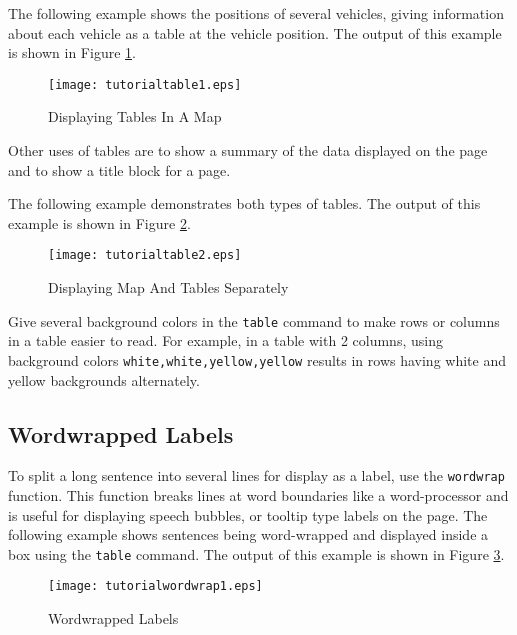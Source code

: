 The following example shows the positions of several vehicles,
giving information about each vehicle as a table at the vehicle
position.  The output of this example is shown in Figure \ref{tutorialtable1}.



\begin{figure}[htb]
\texttt{[image: tutorialtable1.eps]}
\caption{Displaying Tables In A Map}
\label{tutorialtable1}
\end{figure}

Other uses of tables are to show a summary of the data 
displayed on the page and to show a title block for a page.

The following example demonstrates both types of tables.
The output of this example is shown in Figure \ref{tutorialtable2}.



\begin{figure}[htb]
\texttt{[image: tutorialtable2.eps]}
\caption{Displaying Map And Tables Separately}
\label{tutorialtable2}
\end{figure}

Give several background colors in the \texttt{table} command to make rows or
columns in a table easier to read.  For example, in a table with 2 columns,
using background colors \texttt{white,white,yellow,yellow} results
in rows having white and yellow backgrounds alternately.

\subsection{Wordwrapped Labels}

To split a long sentence into several lines for display as a label, use
the \texttt{wordwrap} function.
This function breaks lines at word boundaries like a word-processor
and is useful for displaying speech bubbles, or tooltip type
labels on the page.
The following example shows sentences being word-wrapped and
displayed inside a box using the \texttt{table} command.
The output of this example
is shown in Figure \ref{tutorialwordwrap1}.



\begin{figure}[htb]
\texttt{[image: tutorialwordwrap1.eps]}
\caption{Wordwrapped Labels}
\label{tutorialwordwrap1}
\end{figure}

